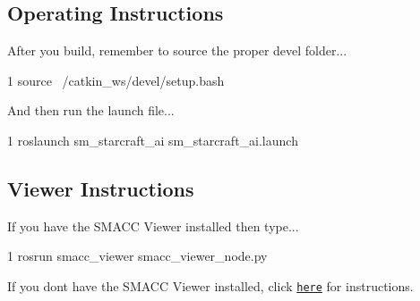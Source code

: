 \subsection*{Operating Instructions}

After you build, remember to source the proper devel folder...


\begin{DoxyCode}
1 source ~/catkin\_ws/devel/setup.bash
\end{DoxyCode}


And then run the launch file...


\begin{DoxyCode}
1 roslaunch sm\_starcraft\_ai sm\_starcraft\_ai.launch
\end{DoxyCode}


\subsection*{Viewer Instructions}

If you have the S\+M\+A\+CC Viewer installed then type...


\begin{DoxyCode}
1 rosrun smacc\_viewer smacc\_viewer\_node.py
\end{DoxyCode}


If you don\textquotesingle{}t have the S\+M\+A\+CC Viewer installed, click \href{http://smacc.ninja/smacc-viewer/}{\tt here} for instructions. 